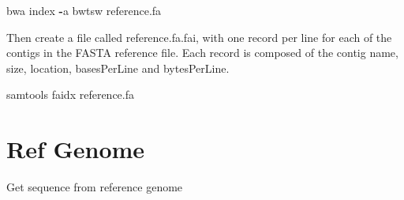 \documentclass[]{book}
\newenvironment{Shaded}{\begin{snugshade}}{\end{snugshade}}
\newcommand{\CharTok}[1]{\textcolor[rgb]{0.31,0.60,0.02}{#1}}
\newcommand{\CommentTok}[1]{\textcolor[rgb]{0.56,0.35,0.01}{\textit{#1}}}
\newcommand{\ControlFlowTok}[1]{\textcolor[rgb]{0.13,0.29,0.53}{\textbf{#1}}}
\newcommand{\ImportTok}[1]{#1}
\newcommand{\KeywordTok}[1]{\textcolor[rgb]{0.13,0.29,0.53}{\textbf{#1}}}
\newcommand{\NormalTok}[1]{#1}
\newcommand{\OperatorTok}[1]{\textcolor[rgb]{0.81,0.36,0.00}{\textbf{#1}}}
\newcommand{\SpecialCharTok}[1]{\textcolor[rgb]{0.00,0.00,0.00}{#1}}
\newcommand{\StringTok}[1]{\textcolor[rgb]{0.31,0.60,0.02}{#1}}
\newcommand{\VariableTok}[1]{\textcolor[rgb]{0.00,0.00,0.00}{#1}}
\begin{document}
\begin{Shaded}
\begin{Highlighting}[]
\NormalTok{bwa index }\OperatorTok{-}\NormalTok{a bwtsw reference.fa}
\end{Highlighting}
\end{Shaded}

Then create a file called reference.fa.fai, with one record per line for each of the contigs in the FASTA reference file. Each record is composed of the contig name, size, location, basesPerLine and bytesPerLine.

\begin{Shaded}
\begin{Highlighting}[]
\NormalTok{samtools faidx reference.fa}
\end{Highlighting}
\end{Shaded}

\hypertarget{ref-genome}{%
\section{Ref Genome}\label{ref-genome}}

Get sequence from reference genome

\begin{Shaded}
\end{Shaded}
\end{document}
